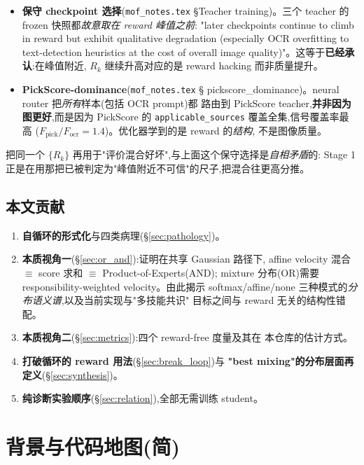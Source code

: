 \documentclass[11pt,a4paper]{article}
\theoremstyle{definition}
\begin{document}
\begin{itemize}[leftmargin=1.5em]
\item \textbf{保守 checkpoint 选择}(\texttt{mof\_notes.tex} \S Teacher
training)。三个 teacher 的 frozen 快照都\emph{故意取在 reward 峰值之前}:
"later checkpoints continue to climb in reward but exhibit qualitative
degradation (especially OCR overfitting to text-detection heuristics at the
cost of overall image quality)"。这等于\textbf{已经承认}:在峰值附近,
$R_k$ 继续升高对应的是 reward hacking 而非质量提升。
\item \textbf{PickScore-dominance}(\texttt{mof\_notes.tex} \S
pickscore\_dominance)。neural router 把\emph{所有}样本(包括 OCR prompt)都
路由到 PickScore teacher,\textbf{并非因为图更好},而是因为 PickScore 的
\texttt{applicable\_sources} 覆盖全集,信号覆盖率最高
($F_{\text{pick}}/F_{\text{ocr}}=1.4$)。优化器学到的是 reward 的\emph{结构},
不是图像质量。
\end{itemize}

把同一个 $\{R_k\}$ 再用于"评价混合好坏",与上面这个保守选择是\emph{自相矛盾}的:
Stage 1 正是在用那把已被判定为"峰值附近不可信"的尺子,把混合往更高分推。

\subsection{本文贡献}
\label{ssec:contrib}

\begin{enumerate}[leftmargin=1.5em]
\item \textbf{自循环的形式化}与四类病理(\S\ref{sec:pathology})。
\item \textbf{本质视角一}(\S\ref{sec:or_and}):证明在共享 Gaussian 路径下,
affine velocity 混合 $\equiv$ score 求和 $\equiv$ Product-of-Experts(AND);
mixture 分布(OR)需要 responsibility-weighted velocity。由此揭示
softmax/affine/none 三种模式的\emph{分布语义谱},以及当前实现与"多技能共识"
目标之间与 reward 无关的结构性错配。
\item \textbf{本质视角二}(\S\ref{sec:metrics}):四个 reward-free 度量及其在
本仓库的估计方式。
\item \textbf{打破循环的 reward 用法}(\S\ref{sec:break_loop})与
\textbf{"best mixing"的分布层面再定义}(\S\ref{sec:synthesis})。
\item \textbf{纯诊断实验顺序}(\S\ref{sec:relation}),全部无需训练 student。
\end{enumerate}

\section{背景与代码地图(简)}
\label{sec:background}
\end{document}
